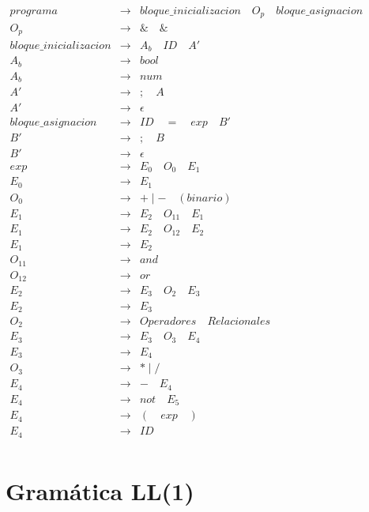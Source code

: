 \documentclass{article}
\begin{document}
$
\begin{array}{lcl}
	programa & \rightarrow & bloque\_inicializacion \quad O_p\quad bloque\_asignacion \\
	O_p & \rightarrow & \&\quad \& \\
	bloque\_inicializacion & \rightarrow & A_b\quad ID\quad A' \\
	A_b & \rightarrow & bool \\
	A_b & \rightarrow & num \\
	A' & \rightarrow & ;\quad  A\\
	A' & \rightarrow & \epsilon\\
	bloque\_asignacion & \rightarrow & ID\quad =\quad exp\quad B' \\
	B' & \rightarrow & ;\quad  B\\
	B' & \rightarrow & \epsilon\\
	
	exp & \rightarrow & E_0\quad O_0\quad E_1 \\
	E_0 & \rightarrow & E_1 \\
	O_0 & \rightarrow & + \mid -\quad (binario) \\
	E_1 & \rightarrow & E_2\quad O_{11}\quad E_1 \\
	E_1 & \rightarrow & E_2\quad O_{12}\quad E_2 \\
	E_1 & \rightarrow & E_2 \\
	O_{11} & \rightarrow & and \\
	O_{12} & \rightarrow & or \\
	E_2 & \rightarrow & E_3\quad O_2\quad E_3 \\
	E_2 & \rightarrow & E_3 \\
	O_2 & \rightarrow & Operadores\quad Relacionales \\
	E_3 & \rightarrow & E_3\quad O_3\quad E_4 \\
	E_3 & \rightarrow & E_4 \\
	O_3 & \rightarrow & * \mid / \\
	E_4 & \rightarrow & - \quad E_4 \\
	E_4 & \rightarrow & not \quad E_5 \\
	E_4 & \rightarrow & (\quad exp\quad ) \\
	E_4 & \rightarrow & ID \\
\end{array}
$

\newpage

\section{Gramática LL(1)}
\end{document}
